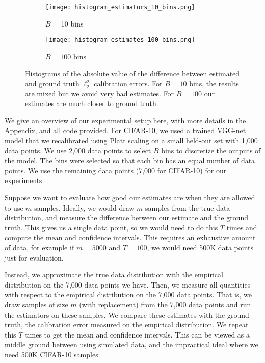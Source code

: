 \begin{figure}
  \centering
  \centering
     \begin{subfigure}[b]{0.45\textwidth}
         \centering
         \texttt{[image: histogram\_estimators\_10\_bins.png]}
         \caption{$B$ = 10 bins}
     \end{subfigure}
     \hfill
     \begin{subfigure}[b]{0.45\textwidth}
         \centering
         \texttt{[image: histogram\_estimates\_100\_bins.png]}
         \caption{$B = 100$ bins}
     \end{subfigure}
  \caption{Histograms of the absolute value of the difference between estimated and ground truth $\ell_2^2$ calibration errors. For $B = 10$ bins, the results are mixed but we avoid very bad estimates. For $B=100$ our estimates are much closer to ground truth.}
  \label{fig:histograms_estimators_bins}
\end{figure}


We give an overview of our experimental setup here, with more details in the Appendix, and all code provided. For CIFAR-10, we used a trained VGG-net model that we recalibrated using Platt scaling on a small held-out set with 1,000 data points. We use 2,000 data points to select $B$ bins to discretize the outputs of the model. The bins were selected so that each bin has an equal number of data points. We use the remaining data points (7,000 for CIFAR-10) for our experiments. 

Suppose we want to evaluate how good our estimates are when they are allowed to use $m$ samples. Ideally, we would draw $m$ samples from the true data distribution, and measure the difference between our estimate and the ground truth. This gives us a single data point, so we would need to do this $T$ times and compute the mean and confidence intervals. This requires an exhaustive amount of data, for example if $m = 5000$ and $T = 100$, we would need 500K data points just for evaluation.

Instead, we approximate the true data distribution with the empirical distribution on the 7,000 data points we have. Then, we measure all quantities with respect to the empirical distribution on the 7,000 data points. That is, we draw samples of size $m$ (with replacement) from the 7,000 data points and run the estimators on these samples. We compare these estimates with the ground truth, the calibration error measured on the empirical distribution. We repeat this $T$ times to get the mean and confidence intervals. This can be viewed as a middle ground between using simulated data, and the impractical ideal where we need 500K CIFAR-10 samples.


